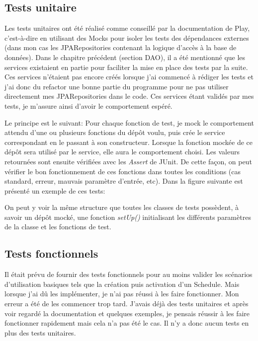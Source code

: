 \documentclass[french]{article}
\begin{document}
\subsection{Tests unitaire}

Les tests unitaires ont été réalisé comme conseillé par la documentation de Play, c'est-à-dire en utilisant des Mocks pour isoler les tests des dépendances externes (dans mon cas les JPARepositories contenant la logique d'accès à la base de données). Dans le chapitre précédent (section DAO), il a été mentionné que les services existaient en partie pour faciliter la mise en place des tests par la suite. Ces services n'étaient pas encore créés lorsque j'ai commencé à rédiger les tests et j'ai donc du refactor une bonne partie du programme pour ne pas utiliser directement mes JPARepositories dans le code. Ces services étant validés par mes tests, je m'assure ainsi d'avoir le comportement espéré.

Le principe est le suivant:\newline
Pour chaque fonction de test, je mock le comportement attendu d'une ou plusieurs fonctions du dépôt voulu, puis crée le service correspondant en le passant à son constructeur. Lorsque la fonction mockée de ce dépôt sera utilisé par le service, elle aura le comportement choisi. Les valeurs retournées sont ensuite vérifiées avec les \textit{Assert} de JUnit. De cette façon, on peut vérifier le bon fonctionnement de ces fonctions dans toutes les conditions (cas standard, erreur, mauvais paramètre d'entrée, etc). \newline
Dans la figure suivante est présenté un exemple de ces tests:



On peut y voir la même structure que toutes les classes de tests possèdent, à savoir un dépôt mocké, une fonction \textit{setUp()} initialisant les différents paramètres de la classe et les fonctions de test.

\subsection{Tests fonctionnels}

Il était prévu de fournir des tests fonctionnels pour au moins valider les scénarios d'utilisation basiques tels que la création puis activation d'un Schedule. Mais lorsque j'ai dû les implémenter, je n'ai pas réussi à  les faire fonctionner. Mon erreur a été de les commencer trop tard. J'avais déjà des tests unitaires et après voir regardé la documentation et quelques exemples, je pensais réussir à les faire fonctionner rapidement mais cela n'a pas été le cas. \newline
Il n'y a donc aucun tests en plus des tests unitaires.
\end{document}

